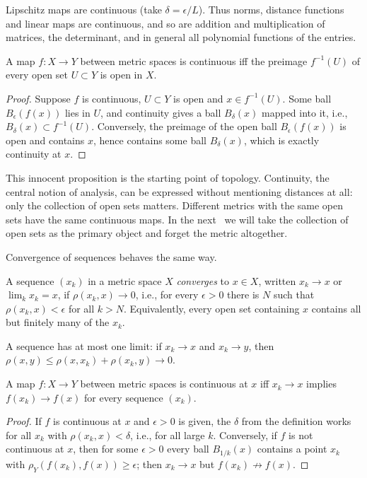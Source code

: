 Lipschitz maps are continuous (take $\delta=\epsilon/L$). Thus norms, distance functions and linear maps are continuous, and so are addition and multiplication of matrices, the determinant, and in general all polynomial functions of the entries.

\begin{prop}\label{prop continuity via open sets}
    A map $f:X\to Y$ between metric spaces is continuous iff the preimage $f^{-1}(U)$ of every open set $U\subset Y$ is open in $X$.
\end{prop}
\begin{proof}
    Suppose $f$ is continuous, $U\subset Y$ is open and $x\in f^{-1}(U)$. Some ball $B_\epsilon(f(x))$ lies in $U$, and continuity gives a ball $B_\delta(x)$ mapped into it, i.e., $B_\delta(x)\subset f^{-1}(U)$. Conversely, the preimage of the open ball $B_\epsilon(f(x))$ is open and contains $x$, hence contains some ball $B_\delta(x)$, which is exactly continuity at $x$.
\end{proof}

\begin{intu*}
    This innocent proposition is the starting point of topology. Continuity, the central notion of analysis, can be expressed without mentioning distances at all: only the collection of open sets matters. Different metrics with the same open sets have the same continuous maps. In the next \sect\ we will take the collection of open sets as the primary object and forget the metric altogether.
\end{intu*}

Convergence of sequences behaves the same way.

\begin{defn}[Convergence]
    A sequence $(x_k)$ in a metric space $X$ \emph{converges} to $x\in X$, written $x_k\to x$ or $\lim_k x_k=x$, if $\rho(x_k,x)\to0$, i.e., for every $\epsilon>0$ there is $N$ such that $\rho(x_k,x)<\epsilon$ for all $k>N$. Equivalently, every open set containing $x$ contains all but finitely many of the $x_k$.
\end{defn}

A sequence has at most one limit: if $x_k\to x$ and $x_k\to y$, then $\rho(x,y)\leq\rho(x,x_k)+\rho(x_k,y)\to0$.

\begin{prop}\label{prop sequential continuity}
    A map $f:X\to Y$ between metric spaces is continuous at $x$ iff $x_k\to x$ implies $f(x_k)\to f(x)$ for every sequence $(x_k)$.
\end{prop}
\begin{proof}
    If $f$ is continuous at $x$ and $\epsilon>0$ is given, the $\delta$ from the definition works for all $x_k$ with $\rho(x_k,x)<\delta$, i.e., for all large $k$. Conversely, if $f$ is not continuous at $x$, then for some $\epsilon>0$ every ball $B_{1/k}(x)$ contains a point $x_k$ with $\rho_Y(f(x_k),f(x))\geq\epsilon$; then $x_k\to x$ but $f(x_k)\not\to f(x)$.
\end{proof}

